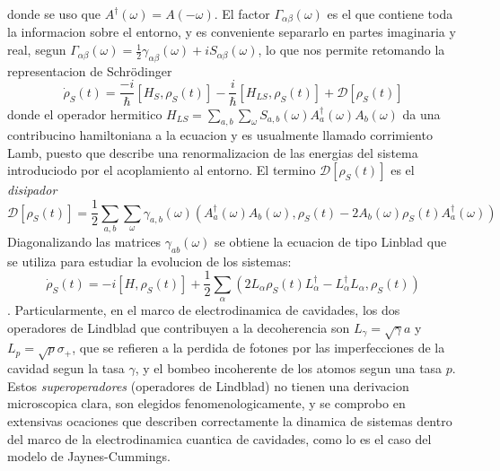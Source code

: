 donde se uso que $A^\dagger(\omega)=A(-\omega)$. El factor $\Gamma_{\alpha\beta}(\omega)$ es el que contiene toda la informacion sobre el entorno, y es conveniente separarlo en partes imaginaria y real, segun $\Gamma_{\alpha\beta}(\omega)=\frac{1}{2}\gamma_{\alpha\beta}(\omega)+iS_{\alpha\beta}(\omega)$, lo que nos permite retomando la representacion de Schrödinger
\begin{equation}
    \dot \rho_S(t)=\frac{-i}{\hbar}[H_S,\rho_S(t)]-\frac{i}{\hbar}[H_{LS},\rho_S(t)]+\mathcal{D}[\rho_S(t)]
\end{equation}
donde el operador hermitico $H_{LS}=\sum_{a,b}\sum_\omega S_{a,b}(\omega)A^\dagger_a(\omega)A_b(\omega)$ da una contribucino hamiltoniana a la ecuacion y es usualmente llamado corrimiento Lamb, puesto que describe una renormalizacion de las energias del sistema introduciodo por el acoplamiento al entorno. El termino $\mathcal{D}[\rho_S(t)]$ es el \textit{disipador}
\begin{equation}
    \mathcal{D}[\rho_S(t)]=\frac{1}{2}\sum_{a,b}\sum_\omega \gamma_{a,b}(\omega) \left( {A^\dagger_a(\omega)A_b(\omega),\rho_S(t)}-2A_b(\omega)\rho_S(t)A^\dagger_a(\omega)\right)
\end{equation}
Diagonalizando las matrices $\gamma_{ab}(\omega)$ se obtiene la ecuacion de tipo Linblad que se utiliza para estudiar la evolucion de los sistemas:
\begin{equation}
    \dot \rho_S(t)=-i [H,\rho_S(t)]+\frac{1}{2}\sum_\alpha \left(2L_\alpha\rho_S(t)L^\dagger_\alpha-{L^\dagger_\alpha L_\alpha,\rho_S(t)} \right)
\end{equation}
. Particularmente, en el marco de electrodinamica de cavidades, los dos operadores de Lindblad que contribuyen a la decoherencia son $L_\gamma=\sqrt{\gamma}a$ y $L_p=\sqrt{p} \sigma_+$, que se refieren a la perdida de fotones por las imperfecciones de la cavidad segun la tasa $\gamma$, y el bombeo incoherente de los atomos segun una tasa $p$. Estos \textit{superoperadores} (operadores de Lindblad) no tienen una derivacion microscopica clara, son elegidos fenomenologicamente, y se comprobo en extensivas ocaciones que describen correctamente la dinamica de sistemas dentro del marco de la electrodinamica cuantica de cavidades, como lo es el caso del modelo de Jaynes-Cummings.

